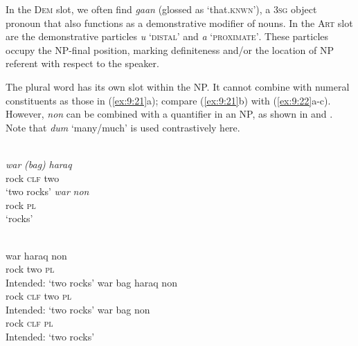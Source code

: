 
In the \textsc{Dem} slot, we often find \textit{ga}\textit{{\textglotstop}}\textit{an} (glossed as `that.\textsc{knwn}'), a 3\textsc{sg} object pronoun that also functions as a demonstrative modifier of nouns. In the \textsc{Art} slot are the demonstrative particles \textit{u} `\textsc{distal'} and \textit{a} `\textsc{proximate'}. These particles occupy the NP-final position, marking definiteness and/or the location of NP referent with respect to the speaker.

The plural word has its own slot within the NP. It cannot combine with numeral constituents as those in (\ref{ex:9:21}a); compare (\ref{ex:9:21}b) with (\ref{ex:9:22}a-c). However, \textit{non} can be combined with a quantifier in an NP, as shown in  and . Note that \textit{dum} `many/much' is used contrastively here.


\ea%
\label{ex:9:21}
 \\
\ea
\gll \textit{war} \textit{(bag)} \textit{haraq}  \\
  rock \textsc{clf} two \\
\glt `two rocks'
\ex
\gll \textit{war} \textit{non}\\
  rock \textsc{pl}\\
 `rocks'
\z
\z


\ea%
\label{ex:9:22}
 \\
\ea
\gll  *war haraq non \\
  rock two \textsc{pl}   \\
\glt Intended: `two rocks'
\ex
\gll *war bag haraq non \\
  rock \textsc{clf} two \textsc{pl}   \\
\glt  Intended: `two rocks'
\ex
\gll *war bag non \\
   rock \textsc{clf} \textsc{pl}  \\
\glt Intended: `two rocks'
\z
\z





